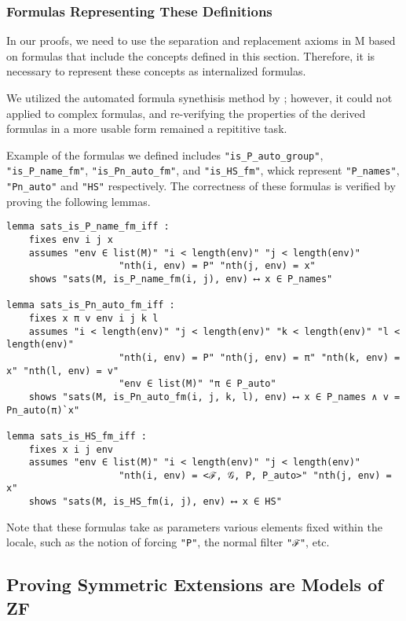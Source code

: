 \documentclass{report}
\newenvironment{isaframe}{\begin{mdframed}[topline=false, rightline=false, bottomline=false]}{\end{mdframed}}
\begin{document}
\subsubsection{Formulas Representing These Definitions}
In our proofs, we need to use the separation and replacement axioms in M
based on formulas that include the concepts defined in this section.
Therefore, it is necessary to represent these concepts as internalized formulas.

We utilized the automated formula synethisis method by \cite{gunther_forcing};
however, it could not applied to complex formulas, 
and re-verifying the properties of the derived formulas in a more usable form remained a repititive task.

Example of the formulas we defined includes \texttt{"is\_P\_auto\_group"}, \texttt{"is\_P\_name\_fm"}, \texttt{"is\_Pn\_auto\_fm"}, and \texttt{"is\_HS\_fm"},
whick represent \texttt{"P\_names"}, \texttt{"Pn\_auto"} and \texttt{"HS"} respectively.
The correctness of these formulas is verified by proving the following lemmas. 

\begin{isaframe}
\begin{verbatim}
lemma sats_is_P_name_fm_iff : 
    fixes env i j x 
    assumes "env ∈ list(M)" "i < length(env)" "j < length(env)" 
                    "nth(i, env) = P" "nth(j, env) = x"  
    shows "sats(M, is_P_name_fm(i, j), env) ⟷ x ∈ P_names" 

lemma sats_is_Pn_auto_fm_iff :
    fixes x π v env i j k l
    assumes "i < length(env)" "j < length(env)" "k < length(env)" "l < length(env)" 
                    "nth(i, env) = P" "nth(j, env) = π" "nth(k, env) = x" "nth(l, env) = v" 
                    "env ∈ list(M)" "π ∈ P_auto" 
    shows "sats(M, is_Pn_auto_fm(i, j, k, l), env) ⟷ x ∈ P_names ∧ v = Pn_auto(π)`x" 

lemma sats_is_HS_fm_iff : 
    fixes x i j env 
    assumes "env ∈ list(M)" "i < length(env)" "j < length(env)" 
                    "nth(i, env) = <ℱ, 𝒢, P, P_auto>" "nth(j, env) = x" 
    shows "sats(M, is_HS_fm(i, j), env) ⟷ x ∈ HS" 
\end{verbatim}
\end{isaframe}

Note that these formulas take as parameters various elements fixed within the locale, 
such as the notion of forcing \texttt{"P"}, the normal filter \texttt{"ℱ"}, etc.


\subsection{Proving Symmetric Extensions are Models of ZF}
\end{document}
